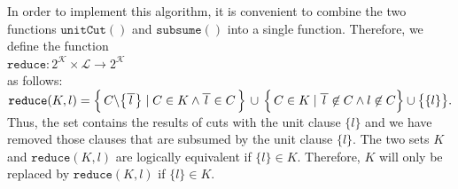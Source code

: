In order to implement this algorithm, it is convenient to combine the two functions $\texttt{unitCut}()$ and
$\texttt{subsume}()$ into a single function. Therefore, we define the function
\\[0.2cm]
\hspace*{1.3cm}
$\texttt{reduce}: 2^\mathcal{K} \times \mathcal{L} \rightarrow 2^\mathcal{K}$
\\[0.2cm]
as follows: 
\\[0.2cm]
\hspace*{1.3cm}
$\texttt{reduce}(K,l)  = 
 \Bigl\{\, C \backslash \bigl\{\overline{\,l\,}\bigr\} \;|\; C \in K \wedge \overline{\,l\,} \in C \,\Bigr\} 
       \,\cup\, \Bigl\{\, C \in K \mid \overline{\,l\,} \not\in C \wedge l \not\in C \Bigr\} \cup \bigl\{\{l\}\bigr\}.
$
\\[0.2cm]
Thus, the set contains the results of cuts with
the unit clause $\{l\}$ and we have removed those clauses that are subsumed by the unit clause $\{l\}$.
The two sets $K$ and $\texttt{reduce}(K,l)$ are logically equivalent if $\{l\} \in K$.
Therefore, $K$ will only be replaced by $\mathtt{reduce}(K, l)$ if $\{l\} \in K$.

